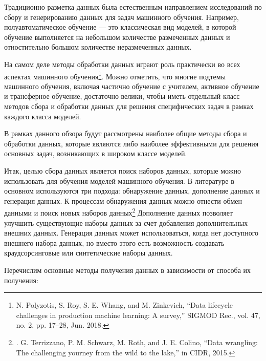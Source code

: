 \documentclass[12pt,a4paper, oneside]{extreport}
\begin{document}
Традиционно разметка данных была естественным направлением исследований по сбору и генерированию данных  для задач машинного обучения. Например, полуавтоматическое обучение — это классическая вид моделей, в которой обучение выполняется на небольшом количестве размеченных данных и отностительно большом  количестве неразмеченных данных. 

На самом деле методы обработки  данных  играют  роль практически во всех аспектах машинного обучения\footnote{N. Polyzotis, S. Roy, S. E. Whang, and M. Zinkevich, “Data 	lifecycle challenges in production machine learning: A survey,” 	SIGMOD Rec., vol. 47, no. 2, pp. 17–28, Jun. 2018.}. Можно отметить, что многие подтемы машинного обучения, включая частично обучение с учителем, активное обучение и трансферное обучение, достаточно велики, чтобы иметь  отдельный класс методов сбора и обработки данных для решения специфических задач в рамках каждого класса моделей. 

В рамках данного обзора будут рассмотрены  наиболее общие методы сбора и  обработки данных, которые являются либо наиболее эффективными для решения основных задач, возникающих в широком классе моделей. 


Итак, целью сбора данных является поиск наборов данных, которые можно использовать для обучения моделей машинного обучения. В литературе в основном используются три подхода: обнаружение данных, дополнение данных и генерация данных. 
К процессам обнаружения данных можно отнести обмен данными и поиск новых  наборов данных\footnote{. G. Terrizzano, P. M. Schwarz, M. Roth, and J. E. Colino, “Data 	wrangling: The challenging yourney from the wild to the lake,” in CIDR, 2015.}  Дополнение   данных позволяет  улучшить существующие наборы данных за счет добавления дополнительных внешних данных. Генерация данных может использоваться, когда нет доступного внешнего набора данных, но вместо этого есть возможность создавать краудсорсинговые или синтетические наборы данных. 

Перечислим основные методы  получения данных в зависимости от  способа их получения:
\end{document}
